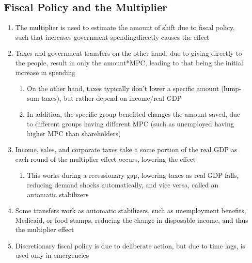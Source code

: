 \documentclass[11 pt, twoside]{article}
\begin{document}
\subsection{Fiscal Policy and the Multiplier}
\begin{enumerate}
\item The multiplier is used to estimate the amount of shift due to fiscal policy, such that increases government spendingdirectly causes the effect
\item Taxes and government transfers on the other hand, due to giving directly to the people, result in only the amount*MPC, leading to that being the initial increase in spending
\begin{enumerate}
\item On the other hand, taxes typically don't lower a specific amount (lump-sum taxes), but rather depend on income/real GDP
\item In addition, the specific group benefited changes the amount saved, due to different groups having different MPC (such as unemployed having higher MPC than shareholders)
\end{enumerate}
\item Income, sales, and corporate taxes take a some portion of the real GDP as each round of the multiplier effect occurs, lowering the effect
\begin{enumerate}
\item This works during a recessionary gap, lowering taxes as real GDP falls, reducing demand shocks automatically, and vice versa, called an automatic stabilizers
\end{enumerate}
\item Some transfers work as automatic stabilizers, such as unemployment benefits, Medicaid, or food stamps, reducing the change in disposable income, and thus the multiplier effect
\item Discretionary fiscal policy is due to deliberate action, but due to time lags, is used only in emergencies
\end{enumerate}
\end{document}

